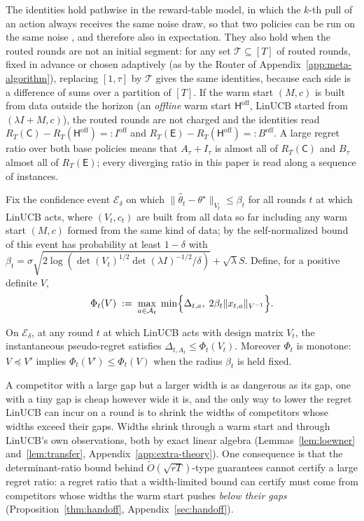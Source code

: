 \documentclass[anon]{alt2027} %
\newcommand{\Cold}{\mathsf{C}}
\newcommand{\Exp}{\mathsf{E}}
\newcommand{\Hyb}{\mathsf{H}}
\begin{document}
\begin{remark}
\label{rem:decomp}
The identities hold pathwise in the reward-table model, in which the $k$-th
pull of an action always receives the same noise draw, so that two policies
can be run on the same noise \citep[\S4.6]{lattimore2020bandit}, and
therefore also in expectation. They also hold when the routed rounds are not
an initial segment: for any set $\mathcal T\subseteq[T]$ of routed rounds,
fixed in advance or chosen adaptively (as by the Router of
Appendix~\ref{app:meta-algorithm}), replacing $[1,\tau]$ by $\mathcal T$
gives the same identities, because each side is a difference of sums over a
partition of $[T]$. If the warm start $(M,c)$ is built from data outside the
horizon (an \emph{offline} warm start $\Hyb^{\mathrm{off}}$, LinUCB started
from $(\lambda I+M,c)$), the routed rounds are not charged and the identities
read $R_T(\Cold)-R_T(\Hyb^{\mathrm{off}})=:I^{\mathrm{off}}$ and
$R_T(\Exp)-R_T(\Hyb^{\mathrm{off}})=:B^{\mathrm{off}}$. A large regret ratio over both
base policies means that $A_\tau+I_\tau$ is almost all of $R_T(\Cold)$ and
$B_\tau$ almost all of $R_T(\Exp)$; every diverging ratio in this paper is
read along a sequence of instances.
\end{remark}

Fix the confidence event $\mathcal E_\delta$ on which
$\|\widehat\theta_t-\theta^\star\|_{V_t}\le\beta_t$ for all rounds $t$ at
which LinUCB acts, where $(V_t,c_t)$ are built from all data so far including
any warm start $(M,c)$ formed from the same kind of data; by the
self-normalized bound of \citet{abbasi2011improved} this event has probability
at least $1-\delta$ with
$\beta_t=\sigma\sqrt{2\log(\det(V_t)^{1/2}\det(\lambda I)^{-1/2}/\delta)}+\sqrt\lambda S$.
Define, for a positive definite $V$,
\begin{equation}
\label{eq:phi}
\Phi_t(V)\;:=\;\max_{a\in\mathcal A_t}\;\min\Bigl\{\Delta_{t,a},\;2\beta_t\|x_{t,a}\|_{V^{-1}}\Bigr\}.
\end{equation}

\begin{lemma}
\label{lem:width-limited}
On $\mathcal E_\delta$, at any round $t$ at which LinUCB acts with design
matrix $V_t$, the instantaneous pseudo-regret satisfies
$\Delta_{t,A_t}\le\Phi_t(V_t)$. Moreover $\Phi_t$ is monotone: $V\preceq V'$
implies $\Phi_t(V')\le\Phi_t(V)$ when the radius $\beta_t$ is held fixed.
\end{lemma}

A competitor with a large gap but a larger width is as dangerous as its gap,
one with a tiny gap is cheap however wide it is, and the only way to lower the
regret LinUCB can incur on a round is to shrink the widths of competitors
whose widths exceed their gaps. Widths shrink through a warm start and through
LinUCB's own observations, both by exact linear algebra
(Lemmas~\ref{lem:loewner} and~\ref{lem:transfer},
Appendix~\ref{app:extra-theory}). One consequence is that the
determinant-ratio bound behind $\widetilde O(\sqrt{rT})$-type guarantees
cannot certify a large regret ratio: a regret ratio that a width-limited bound can
certify must come from competitors whose widths the warm start pushes
\emph{below their gaps}
(Proposition~\ref{thm:handoff}, Appendix~\ref{sec:handoff}).
\end{document}
